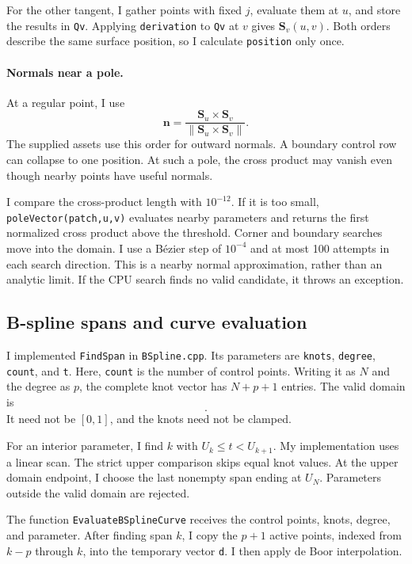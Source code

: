 \documentclass[acmtog]{acmart}
\begin{document}
For the other tangent, I gather points with fixed $j$, evaluate them at $u$, and store the results in \texttt{Qv}. Applying \texttt{derivation} to \texttt{Qv} at $v$ gives $\mathbf S_v(u,v)$. Both orders describe the same surface position, so I calculate \texttt{position} only once.

\paragraph{Normals near a pole.}
At a regular point, I use
\begin{equation}
\mathbf n=\frac{\mathbf S_u\times\mathbf S_v}
{\|\mathbf S_u\times\mathbf S_v\|}.
\end{equation}
The supplied assets use this order for outward normals. A boundary control row can collapse to one position. At such a pole, the cross product may vanish even though nearby points have useful normals.

I compare the cross-product length with $10^{-12}$. If it is too small, \texttt{poleVector(patch,u,v)} evaluates nearby parameters and returns the first normalized cross product above the threshold. Corner and boundary searches move into the domain. I use a B\'ezier step of $10^{-4}$ and at most 100 attempts in each search direction. This is a nearby normal approximation, rather than an analytic limit. If the CPU search finds no valid candidate, it throws an exception.

\subsection{B-spline spans and curve evaluation}
I implemented \texttt{FindSpan} in \texttt{BSpline.cpp}. Its parameters are \texttt{knots}, \texttt{degree}, \texttt{count}, and \texttt{t}. Here, \texttt{count} is the number of control points. Writing it as $N$ and the degree as $p$, the complete knot vector has $N+p+1$ entries. The valid domain is
\begin{equation}
[U_p,U_N].
\end{equation}
It need not be $[0,1]$, and the knots need not be clamped.

For an interior parameter, I find $k$ with $U_k\leq t<U_{k+1}$. My implementation uses a linear scan. The strict upper comparison skips equal knot values. At the upper domain endpoint, I choose the last nonempty span ending at $U_N$. Parameters outside the valid domain are rejected.

The function \texttt{EvaluateBSplineCurve} receives the control points, knots, degree, and parameter. After finding span $k$, I copy the $p+1$ active points, indexed from $k-p$ through $k$, into the temporary vector \texttt{d}. I then apply de Boor interpolation.
\end{document}

